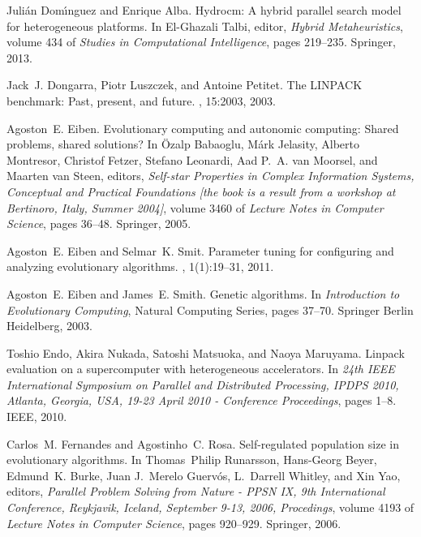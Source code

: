 \documentclass[final,1p,times]{elsarticle}
\begin{document}
\begin{thebibliography}{10}
Juli{\'{a}}n Dom{\'{\i}}nguez and Enrique Alba.
\newblock Hydrocm: {A} hybrid parallel search model for heterogeneous
  platforms.
\newblock In El{-}Ghazali Talbi, editor, {\em Hybrid Metaheuristics}, volume
  434 of {\em Studies in Computational Intelligence}, pages 219--235. Springer,
  2013.

Jack~J. Dongarra, Piotr Luszczek, and Antoine Petitet.
\newblock The {LINPACK} benchmark: Past, present, and future.
, 15:2003,
  2003.

Agoston~E. Eiben.
\newblock Evolutionary computing and autonomic computing: Shared problems,
  shared solutions?
\newblock In {\"{O}}zalp Babaoglu, M{\'{a}}rk Jelasity, Alberto Montresor,
  Christof Fetzer, Stefano Leonardi, Aad P.~A. van Moorsel, and Maarten van
  Steen, editors, {\em Self-star Properties in Complex Information Systems,
  Conceptual and Practical Foundations [the book is a result from a workshop at
  Bertinoro, Italy, Summer 2004]}, volume 3460 of {\em Lecture Notes in
  Computer Science}, pages 36--48. Springer, 2005.

Agoston~E. Eiben and Selmar~K. Smit.
\newblock Parameter tuning for configuring and analyzing evolutionary
  algorithms.
, 1(1):19--31, 2011.

Agoston~E. Eiben and James~E. Smith.
\newblock Genetic algorithms.
\newblock In {\em Introduction to Evolutionary Computing}, Natural Computing
  Series, pages 37--70. Springer Berlin Heidelberg, 2003.

Toshio Endo, Akira Nukada, Satoshi Matsuoka, and Naoya Maruyama.
\newblock Linpack evaluation on a supercomputer with heterogeneous
  accelerators.
\newblock In {\em 24th {IEEE} International Symposium on Parallel and
  Distributed Processing, {IPDPS} 2010, Atlanta, Georgia, USA, 19-23 April 2010
  - Conference Proceedings}, pages 1--8. {IEEE}, 2010.

Carlos~M. Fernandes and Agostinho~C. Rosa.
\newblock Self-regulated population size in evolutionary algorithms.
\newblock In Thomas~Philip Runarsson, Hans{-}Georg Beyer, Edmund~K. Burke, Juan
  J.~Merelo Guerv{\'{o}}s, L.~Darrell Whitley, and Xin Yao, editors, {\em
  Parallel Problem Solving from Nature - {PPSN} IX, 9th International
  Conference, Reykjavik, Iceland, September 9-13, 2006, Procedings}, volume
  4193 of {\em Lecture Notes in Computer Science}, pages 920--929. Springer,
  2006.


\end{thebibliography}
\end{document}
